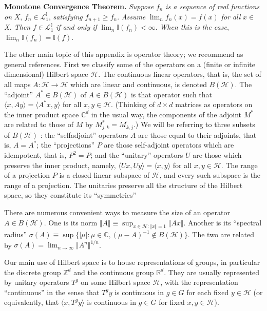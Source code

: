 \documentclass[reqno]{stml-l}
\theoremstyle{plain}
\theoremstyle{definition}
\numberwithin{equation}{chapter}
\begin{document}
\noindent \textbf{Monotone Convergence Theorem.} \emph{Suppose} $f_{n}$ \emph{is a sequence of real functions on} $X,\,f_{n}\in \mathcal{L}_{1}^{\mathbb{I}}$, \emph{satisfying} $f_{n+1}\geq f_{n}$. \emph{Assume} $\lim_{n}f_{n}(x)=f(x)$ \emph{for all} $x\in$ \emph{X. Then} $f\in \mathcal{L}_{1}^{\mathbb{I}}$ \emph{if and only if} $\lim_{n}\mathbb{I}(f_{n})<\infty$. \emph{When this is the case}, $\lim_{n}\mathbb{I}(f_{n})=\mathbb{I}(f)$.

The other main topic of this appendix is operator theory; we recommend \cite{bib:BaN,bib:RiN,bib:Nai} as general references. First we classify some of the operators on a (finite or infinite dimensional) Hilbert space $\mathcal{H}$. The continuous linear operators, that is, the set of all maps $A:\mathcal{H}\longrightarrow \mathcal{H}$ which are linear and continuous, is denoted $B(\mathcal{H})$. The ``adjoint'' $A^{\ast}\in B(\mathcal{H})$ of $A\in B(\mathcal{H})$ is that operator such that $\langle x,Ay\rangle=\langle A^{\ast}x, y\rangle$ for all $x,y\in \mathcal{H}$. (Thinking of $d\times d$ matrices as operators on the inner product space $\mathbb{C}^{d}$ in the usual way, the components of the adjoint $M^{\ast}$ are related to those of $M$ by $M_{j,k}^{\ast}= \overline{M_{k,j}}$.) We will be referring to three subsets of $B(\mathcal{H})$ : the ``selfadjoint'' operators $A$ are those equal to their adjoints, that is, $A= A^{\ast}$; the ``projections'' $P$ are those self-adjoint operators which are idempotent, that is, $P^{2}=P$; and the ``unitary'' operators $U$ are those which preserve the inner product, namely, $\langle Ux,Uy\rangle=\langle x, y\rangle$ for all $x,y\in \mathcal{H}$. The range of a projection $P$ is a closed linear subspace of $\mathcal{H}$, and every such subspace is the range of a projection. The unitaries preserve all the structure of the Hilbert space, so they constitute its ``symmetries''

There are numerous convenient ways to measure the size of an operator $A\in B(\mathcal{H})$. One is its norm $\Vert A\Vert\equiv\sup_{x\in \mathcal{H}:\Vert x\Vert=1}\Vert Ax\Vert$. Another is its ``spectral radius'' $\sigma(A)\equiv\sup\{|\mu|:\mu\in \mathbb{C},(\mu-A)^{-1}\not\in B(\mathcal{H})\}$. The two are related by $\sigma(A)=\lim_{n\rightarrow\infty}\Vert A^{n}\Vert^{1/n}$.

Our main use of Hilbert space is to house representations of groups, in particular the discrete group $\mathbb{Z}^{d}$ and the continuous group $\mathbb{R}^{d}$. They are usually represented by unitary operators $T^{g}$ on some Hilbert space $\mathcal{H}$, with the representation ``continuous'' in the sense that $T^{g}y$ is continuous in $g\in G$ for each fixed $y\in \mathcal{H}$ (or equivalently, that $\langle x, T^{g}y\rangle$ is continuous in $g\in G$ for fixed $x,y\in \mathcal{H}$).
\end{document}
